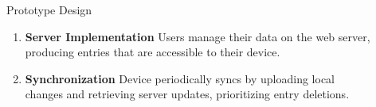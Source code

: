 \documentclass[final]{beamer}
\newlength{\sepwidth}
\newlength{\colwidth}
\newcommand{\separatorcolumn}{\begin{column}{\sepwidth}\end{column}}
\begin{document}
\begin{frame}[t]
\begin{columns}[t]
\begin{column}{\colwidth}
\begin{block}{Prototype Design}
        \begin{enumerate}
          \item \textbf{Server Implementation} Users manage their data on the web server, producing entries that are accessible to their device.
          \item \textbf{Synchronization} Device periodically syncs by uploading local changes and retrieving server updates, prioritizing entry deletions.
        \end{enumerate}
      \end{block}

    \end{column}

    \separatorcolumn

    \begin{column}{\colwidth} 


\end{column}
\end{columns}
\end{frame}
\end{document}
